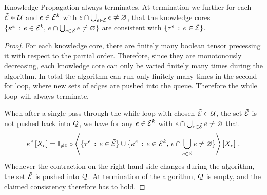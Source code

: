 \begin{theorem}
    Knowledge Propagation  always terminates.
    At termination we further for each $\tilde{\mathcal{E}}\in\mathcal{U}$ and $e\in\mathcal{E}^{k}$ with $e\cap\bigcup_{e\in\tilde{\mathcal{E}}}e\neq\varnothing$, that the knowledge cores $\{\kappa^{e} \,:\, e\in\mathcal{E}^{k}, \, e\cap\bigcup_{e\in\tilde{\mathcal{E}}}e\neq\varnothing\}$ are consistent with $\{\tau^{e} \,:\, e\in\tilde{\mathcal{E}}\}$.
\end{theorem}
\begin{proof}
    For each knowledge core, there are finitely many boolean tensor precessing it with respect to the partial order.
    Therefore, since they are monotonously decreasing, each knowledge core can only be varied finitely many times during the algorithm.
    In total the algorithm can run only finitely many times in the second for loop, where new sets of edges are pushed into the queue.
    Therefore the while loop will always terminate.

    When after a single pass through the while loop with chosen $\tilde{\mathcal{E}}\in\mathcal{U}$, the set $\tilde{\mathcal{E}}$ is not pushed back into $\mathcal{Q}$, we have for any $e\in\mathcal{E}^{k}$ with $e\cap\bigcup_{e\in\tilde{\mathcal{E}}}e\neq\varnothing$ that
    \begin{align*}
        \kappa^{e}\left[X_{e}\right]
        = \mathbb{I}_{\neq0}\circ\left\langle \{\tau^{e} \,:\, e\in\tilde{\mathcal{E}}\} \cup \{\kappa^{e} \,:\, e\in\mathcal{E}^{k}, \, e\cap\bigcup_{e\in\tilde{\mathcal{E}}}e\neq\varnothing\}\right\rangle \left[ X_{e} \right] \, .
    \end{align*}
    Whenever the contraction on the right hand side changes during the algorithm, the set $\tilde{\mathcal{E}}$ is pushed into $\mathcal{Q}$.
    At termination of the algorithm, $\mathcal{Q}$ is empty, and the claimed consistency therefore has to hold.
\end{proof}



